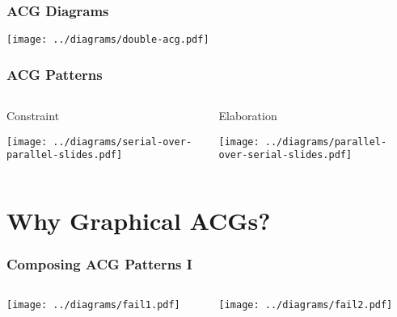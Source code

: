 \documentclass{beamer}
\begin{document}
\begin{frame}
  \frametitle{ACG Diagrams}

  \begin{center}
    \texttt{[image: ../diagrams/double-acg.pdf]}
  \end{center}
\end{frame}


\begin{frame}
  \frametitle{ACG Patterns}

  \begin{columns}[c]
     \begin{column}{0.5\textwidth}
      \begin{block}{Constraint}
        \vspace{2 mm}
        \begin{center}
          \texttt{[image: ../diagrams/serial-over-parallel-slides.pdf]}
        \end{center}
      \end{block}
    \end{column}
    \begin{column}{0.5\textwidth}
      \begin{block}{Elaboration}
        \vspace{2 mm}
        \begin{center}
          \texttt{[image: ../diagrams/parallel-over-serial-slides.pdf]}
        \end{center}
      \end{block}
    \end{column}
 \end{columns}
\end{frame}


\section{Why Graphical ACGs?}

\begin{frame}
  \frametitle{Composing ACG Patterns I}

  \begin{columns}[c]
    \begin{column}{0.5\textwidth}
      \begin{center}
        \texttt{[image: ../diagrams/fail1.pdf]}
      \end{center}
    \end{column}
    \begin{column}{0.5\textwidth}
      \begin{center}
        \texttt{[image: ../diagrams/fail2.pdf]}
      \end{center}
    \end{column}
  \end{columns}
\end{frame}
\end{document}
